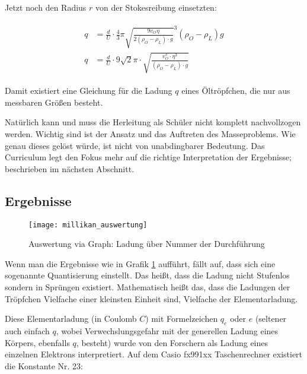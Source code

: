 \noindent Jetzt noch den Radius $r$ von der Stokesreibung einsetzten:

\begin{align}
\begin{split}
	q &= \frac{d}{U} \cdot \frac{4}{3} \pi \sqrt{\frac{9v_{O}\eta}{2(\rho_{O}-\rho_{L}) \cdot g}}^3 (\rho_{O} - \rho_{L}) g \\
	q &= \frac{d}{U} \cdot 9\sqrt{2} \pi \cdot \sqrt{\frac{v_{O}^3 \cdot \eta^3}{(\rho_O - \rho_L) \cdot g}}
\end{split}
\end{align}

Damit existiert eine Gleichung für die Ladung $q$ eines Öltröpfchen, die nur aus messbaren Größen besteht.

\begin{Anmerkung}
Natürlich kann und muss die Herleitung als Schüler nicht komplett nachvollzogen werden. Wichtig sind ist der Ansatz und das Auftreten des Masseproblems. Wie genau dieses gelöst würde, ist nicht von unabdingbarer Bedeutung. Das Curriculum legt den Fokus mehr auf die richtige Interpretation der Ergebnisse; beschrieben im nächsten Abschnitt.
\end{Anmerkung}


\subsection{Ergebnisse}

\begin{figure}[h!]
	\center
	\texttt{[image: millikan\_auswertung]}
	\caption{Auswertung via Graph: Ladung über Nummer der Durchführung}
	\vspace*{-10pt}
	\label{fig:millikan_auswertung}
\end{figure}

Wenn man die Ergebnisse wie in Grafik \ref{fig:millikan_auswertung}  aufführt, fällt auf, dass sich eine sogenannte Quantisierung einstellt. Das heißt, dass die Ladung nicht \glqq Stufenlos\grqq{} sondern in \glqq Sprüngen\grqq{} existiert. Mathematisch heißt das, dass die Ladungen der Tröpfchen Vielfache einer kleinsten Einheit sind, Vielfache der \glqq Elementarladung\grqq .

Diese Elementarladung (in Coulomb $C$) mit Formelzeichen $q_e$ oder $e$ (seltener auch einfach $q$, wobei Verwechslungsgefahr mit der generellen Ladung eines Körpers, ebenfalls $q$, besteht) wurde von den Forschern als Ladung eines einzelnen Elektrons interpretiert. Auf dem Casio fx991xx Taschenrechner existiert die Konstante Nr. 23:


